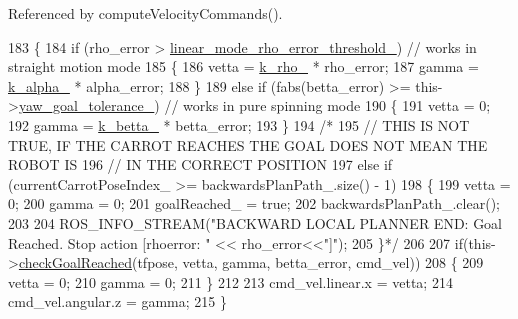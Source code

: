 Referenced by compute\+Velocity\+Commands().


\begin{DoxyCode}
183         \{
184             \textcolor{keywordflow}{if} (rho\_error > \hyperlink{classcl__move__base__z_1_1backward__local__planner_1_1BackwardLocalPlanner_a858efacf597a3a35c97aec9ca53e5900}{linear\_mode\_rho\_error\_threshold\_}) \textcolor{comment}{// works in
       straight motion mode}
185             \{
186                 vetta = \hyperlink{classcl__move__base__z_1_1backward__local__planner_1_1BackwardLocalPlanner_ad8a36184bfb011545c751109e23d3b98}{k\_rho\_} * rho\_error;
187                 gamma = \hyperlink{classcl__move__base__z_1_1backward__local__planner_1_1BackwardLocalPlanner_abf7a5a56de2ee41afba7e63c0628ec35}{k\_alpha\_} * alpha\_error;
188             \}
189             \textcolor{keywordflow}{else} \textcolor{keywordflow}{if} (fabs(betta\_error) >= this->\hyperlink{classcl__move__base__z_1_1backward__local__planner_1_1BackwardLocalPlanner_a9c5104d328041fcde5a3c02664abad48}{yaw\_goal\_tolerance\_}) \textcolor{comment}{// works in pure
       spinning mode}
190             \{
191                 vetta = 0;
192                 gamma = \hyperlink{classcl__move__base__z_1_1backward__local__planner_1_1BackwardLocalPlanner_a9f257183d87f1d732cb7e404f09905ad}{k\_betta\_} * betta\_error;
193             \}
194             \textcolor{comment}{/*}
195 \textcolor{comment}{            // THIS IS NOT TRUE, IF THE CARROT REACHES THE GOAL DOES NOT MEAN THE ROBOT IS}
196 \textcolor{comment}{            // IN THE CORRECT POSITION}
197 \textcolor{comment}{            else if (currentCarrotPoseIndex\_ >= backwardsPlanPath\_.size() - 1)}
198 \textcolor{comment}{            \{}
199 \textcolor{comment}{                vetta = 0;}
200 \textcolor{comment}{                gamma = 0;}
201 \textcolor{comment}{                goalReached\_ = true;}
202 \textcolor{comment}{                backwardsPlanPath\_.clear();}
203 \textcolor{comment}{}
204 \textcolor{comment}{                ROS\_INFO\_STREAM("BACKWARD LOCAL PLANNER END: Goal Reached. Stop action [rhoerror: " <<
       rho\_error<<"]");}
205 \textcolor{comment}{            \}*/}
206 
207             \textcolor{keywordflow}{if}(this->\hyperlink{classcl__move__base__z_1_1backward__local__planner_1_1BackwardLocalPlanner_a6c4363e82119a6a8a5a3bfe309280898}{checkGoalReached}(tfpose, vetta, gamma, betta\_error, cmd\_vel))
208             \{            
209                 vetta = 0;
210                 gamma = 0;
211             \}
212 
213             cmd\_vel.linear.x = vetta;
214             cmd\_vel.angular.z = gamma;
215         \}
\end{DoxyCode}

